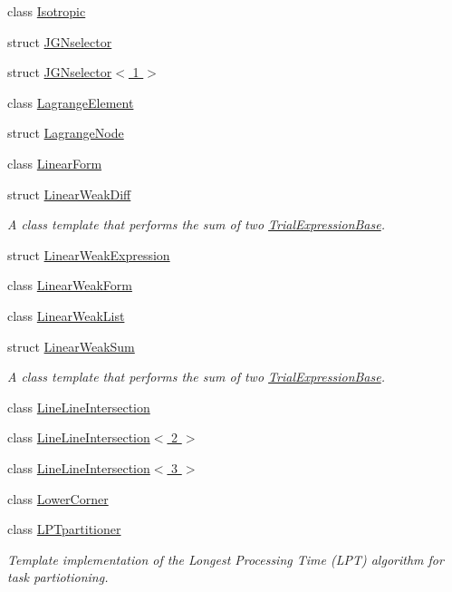 \begin{DoxyCompactItemize}
class \hyperlink{classmodel_1_1_isotropic}{Isotropic}
\item 
struct \hyperlink{structmodel_1_1_j_g_nselector}{J\+G\+Nselector}
\item 
struct \hyperlink{structmodel_1_1_j_g_nselector_3_011_01_4}{J\+G\+Nselector$<$ 1 $>$}
\item 
class \hyperlink{classmodel_1_1_lagrange_element}{Lagrange\+Element}
\item 
struct \hyperlink{structmodel_1_1_lagrange_node}{Lagrange\+Node}
\item 
class \hyperlink{classmodel_1_1_linear_form}{Linear\+Form}
\item 
struct \hyperlink{structmodel_1_1_linear_weak_diff}{Linear\+Weak\+Diff}
\begin{DoxyCompactList}\small\item\em A class template that performs the sum of two \hyperlink{structmodel_1_1_trial_expression_base}{Trial\+Expression\+Base}. \end{DoxyCompactList}\item 
struct \hyperlink{structmodel_1_1_linear_weak_expression}{Linear\+Weak\+Expression}
\item 
class \hyperlink{classmodel_1_1_linear_weak_form}{Linear\+Weak\+Form}
\item 
class \hyperlink{classmodel_1_1_linear_weak_list}{Linear\+Weak\+List}
\item 
struct \hyperlink{structmodel_1_1_linear_weak_sum}{Linear\+Weak\+Sum}
\begin{DoxyCompactList}\small\item\em A class template that performs the sum of two \hyperlink{structmodel_1_1_trial_expression_base}{Trial\+Expression\+Base}. \end{DoxyCompactList}\item 
class \hyperlink{classmodel_1_1_line_line_intersection}{Line\+Line\+Intersection}
\item 
class \hyperlink{classmodel_1_1_line_line_intersection_3_012_01_4}{Line\+Line\+Intersection$<$ 2 $>$}
\item 
class \hyperlink{classmodel_1_1_line_line_intersection_3_013_01_4}{Line\+Line\+Intersection$<$ 3 $>$}
\item 
class \hyperlink{classmodel_1_1_lower_corner}{Lower\+Corner}
\item 
class \hyperlink{classmodel_1_1_l_p_tpartitioner}{L\+P\+Tpartitioner}
\begin{DoxyCompactList}\small\item\em Template implementation of the Longest Processing Time (L\+P\+T) algorithm for task partiotioning. \end{DoxyCompactList}\item 

\end{DoxyCompactItemize}
